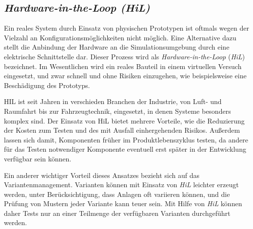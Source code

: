 \subsection{\textit{Hardware-in-the-Loop (HiL)}}

Ein reales System durch Einsatz von physischen Prototypen ist oftmals wegen der Vielzahl an Konfigurationsmöglichkeiten nicht möglich. Eine Alternative dazu stellt die Anbindung der Hardware an die Simulationsumgebung durch eine elektrische Schnittstelle dar. Dieser Prozess wird als \textit{Hardware-in-the-Loop} (\textit{HiL}) bezeichnet. Im Wesentlichen wird ein reales Bauteil in einem virtuellen Versuch eingesetzt, und zwar schnell und ohne Risiken einzugehen, wie beispielsweise eine Beschädigung des Prototyps. \cite{zimmerDurchgaengigerSimulationsprozessZur2015} 


HIL ist seit Jahren in verschieden Branchen der Industrie, von Luft- und Raumfahrt bis zur Fahrzeugtechnik, eingesetzt, in denen Systeme besonders komplex sind. Der Einsatz von HiL bietet mehrere Vorteile, wie die Reduzierung der Kosten zum Testen und des mit Ausfall einhergehenden Risikos. Außerdem lassen sich damit, Komponenten früher im Produktlebenszyklus testen, da andere für das Testen notwendiger Komponente eventuell erst später in der Entwicklung verfügbar sein können. \cite{ellisControlSystemDesign2012} 

Ein anderer wichtiger Vorteil dieses Ansatzes bezieht sich auf das Variantenmanagement. Varianten können mit Einsatz von \textit{HiL} leichter erzeugt werden, unter Berücksichtigung, dass Anlagen oft variieren können, und die Prüfung von Mustern jeder Variante kann teuer sein. Mit Hilfe von \textit{HiL} können daher Tests nur an einer Teilmenge der verfügbaren Varianten durchgeführt werden. \cite{ellisControlSystemDesign2012}    


